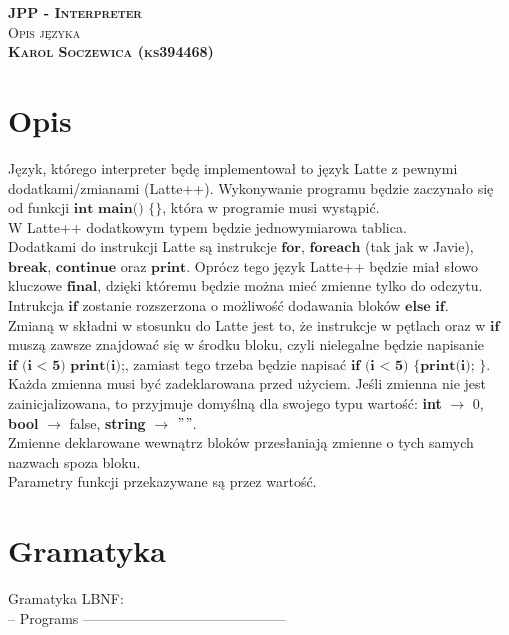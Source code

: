 \documentclass[a4paper]{article}
\begin{document}
\begin{center}
    \textsc{\textbf{\LARGE JPP - Interpreter}}\\
    \textsc{\large Opis języka}\\
    \textsc{\bf Karol Soczewica (ks394468)}
\end{center}

\vspace{0.8cm}

\section*{Opis}
Język, którego interpreter będę implementował to język Latte z pewnymi dodatkami/zmianami (Latte++).
Wykonywanie programu będzie zaczynało się od funkcji $\textbf{int main() \{\}}$, która w programie
musi wystąpić.\\
W Latte++ dodatkowym typem będzie jednowymiarowa tablica.\\ 
Dodatkami do instrukcji Latte są instrukcje $\textbf{for}$, $\textbf{foreach}$ (tak jak w Javie), 
$\textbf{break}$, $\textbf{continue}$ oraz $\textbf{print}$. Oprócz tego język Latte++ będzie miał
słowo kluczowe $\textbf{final}$, dzięki któremu będzie można mieć zmienne tylko do odczytu.
Intrukcja $\textbf{if}$ zostanie rozszerzona o możliwość dodawania bloków $\textbf{else if}$.\\
Zmianą w składni w stosunku do Latte jest to, że instrukcje w pętlach oraz w $\textbf{if}$ muszą
zawsze znajdować się w środku bloku, czyli nielegalne będzie napisanie $\textbf{if (i < 5) print(i);}$,
zamiast tego trzeba będzie napisać $\textbf{if (i < 5) \{ print(i); \}}$.\\
Każda zmienna musi być zadeklarowana przed użyciem. Jeśli zmienna nie jest zainicjalizowana, to
przyjmuje domyślną dla swojego typu wartość: \textbf{int} $\rightarrow$ 0, \textbf{bool} $\rightarrow$ false,
\textbf{string} $\rightarrow$ $"$$"$.\\
Zmienne deklarowane wewnątrz bloków przesłaniają zmienne o tych samych nazwach spoza bloku.\\
Parametry funkcji przekazywane są przez wartość.

\section*{Gramatyka}
Gramatyka LBNF:\\
-- Programs --------------------------------------------\\
\end{document}
